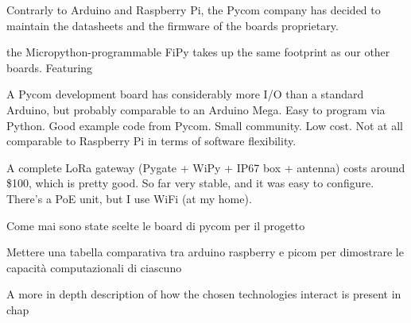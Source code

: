 		
		
		
		Contrarly to Arduino and Raspberry Pi, the Pycom company has decided to maintain the datasheets and the firmware of the boards proprietary.
		
		
		the Micropython-programmable FiPy takes up the same footprint as our other boards. Featuring 
		
		
		
		A Pycom development board has considerably more I/O than a standard Arduino, but probably comparable to an Arduino Mega. Easy to program via Python. Good example code from Pycom. Small community. Low cost. Not at all comparable to Raspberry Pi in terms of software flexibility.
		
		A complete LoRa gateway (Pygate + WiPy + IP67 box + antenna) costs around \$100, which is pretty good. So far very stable, and it was easy to configure. There's a PoE unit, but I use WiFi (at my home).

		Come mai sono state scelte le board di pycom per il progetto

		Mettere una tabella comparativa tra arduino raspberry e picom per dimostrare le capacità computazionali di ciascuno
		
		
		A more in depth description of how the chosen technologies interact is present in chap

		


	